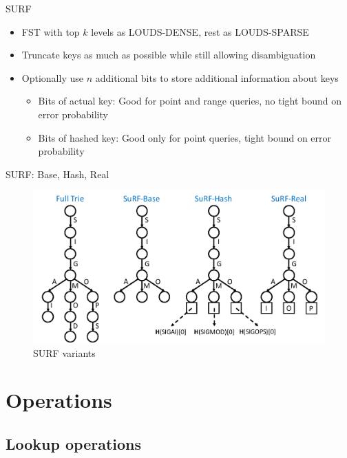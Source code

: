 \documentclass{beamer}
\begin{document}
\begin{frame}{SURF}
		\begin{itemize}
				\item FST with top $k$ levels as LOUDS-DENSE, rest as
						LOUDS-SPARSE
				\item Truncate keys as much as possible while still allowing
						disambiguation
				\item Optionally use $n$ additional bits to store additional
						information about keys
						\begin{itemize}
								\item Bits of actual key: Good for point and
										range queries, no tight bound on error
										probability
								\item Bits of hashed key: Good only for point
										queries, tight bound on error
										probability
						\end{itemize}
		\end{itemize}
\end{frame}

\begin{frame}{SURF: Base, Hash, Real}
		\begin{figure}
				\centering
				\includegraphics[width=\textwidth]{resources/surf}
				\caption{SURF variants \autocite{zhangSuRFPracticalRange2018}}
		\end{figure}
\end{frame}

\section{Operations}

\subsection{Lookup operations}
\end{document}
